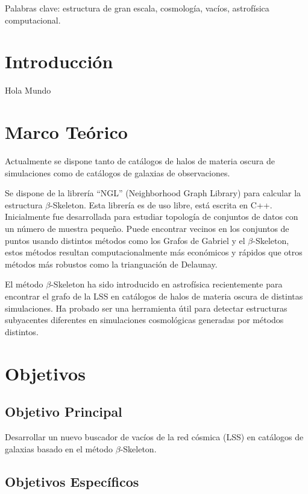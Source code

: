 \documentclass[preprint]{aastex62}
\begin{document}
  \medskip

  Palabras clave: estructura de gran escala, cosmología, vacíos,
  astrofísica computacional.


  \section{Introducción}

  Hola Mundo

  \section{Marco Teórico}

  Actualmente se dispone tanto de catálogos de halos de materia oscura de simulaciones como de catálogos de galaxias de observaciones.

  Se dispone de la librería ``NGL''\citep{ngl} (Neighborhood Graph Library)
  para calcular la estructura $\beta$-Skeleton. Esta librería es de uso libre, está escrita en C++.
  Inicialmente fue desarrollada para estudiar topología de conjuntos de datos con un número de muestra
  pequeño. Puede encontrar vecinos en los conjuntos de puntos usando distintos métodos como los
  Grafos de Gabriel y el $\beta$-Skeleton, estos métodos resultan computacionalmente más económicos
  y rápidos que otros métodos más robustos como la trianguación de Delaunay.

  El método $\beta$-Skeleton ha sido introducido en astrofísica recientemente \citep{Fang2018} para
  encontrar el grafo de la LSS en catálogos de halos de materia oscura de distintas simulaciones.
  Ha probado ser una herramienta útil para detectar estructuras subyacentes diferentes en
  simulaciones cosmológicas generadas por métodos distintos.
  

  \section{Objetivos}

  \subsection{Objetivo Principal}
  Desarrollar un nuevo buscador de vacíos de la red cósmica (LSS) en catálogos de galaxias
  basado en el método $\beta$-Skeleton.
  
  \subsection{Objetivos Específicos}
\end{document}
